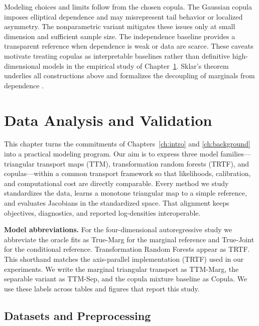 \documentclass[11pt,a4paper,twoside]{book}\usepackage[]{graphicx}\usepackage[]{xcolor}
\begin{document}
Modeling choices and limits follow from the chosen copula. The Gaussian copula imposes elliptical dependence and may misrepresent tail behavior or localized asymmetry. The nonparametric variant mitigates these issues only at small dimension and sufficient sample size. The independence baseline provides a transparent reference when dependence is weak or data are scarce. These caveats motivate treating copulas as interpretable baselines rather than definitive high-dimensional models in the empirical study of Chapter~\ref{ch:dataanalysis}. Sklar’s theorem underlies all constructions above and formalizes the decoupling of marginals from dependence \citep{sklar1959fonctions}.





\chapter{Data Analysis and Validation}\label{ch:dataanalysis}

This chapter turns the commitments of Chapters~\ref{ch:intro} and \ref{ch:background} into a practical modeling program. Our aim is to express three model families---triangular transport maps (TTM), transformation random forests (TRTF), and copulas---within a common transport framework so that likelihoods, calibration, and computational cost are directly comparable. Every method we study standardizes the data, learns a monotone triangular map to a simple reference, and evaluates Jacobians in the standardized space. That alignment keeps objectives, diagnostics, and reported log-densities interoperable.

\textbf{Model abbreviations.} For the four-dimensional autoregressive study we abbreviate the oracle fits as True-Marg for the marginal reference and True-Joint for the conditional reference. Transformation Random Forests appear as TRTF. This shorthand matches the axis-parallel implementation (TRTF) used in our experiments. We write the marginal triangular transport as TTM-Marg, the separable variant as TTM-Sep, and the copula mixture baseline as Copula. We use these labels across tables and figures that report this study.

\section{Datasets and Preprocessing}\label{sec:datasets-preprocessing}\label{sec:setup}
\end{document}
